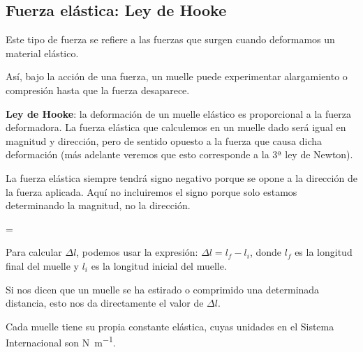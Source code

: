 \subsection{Fuerza elástica: Ley de Hooke}

Este tipo de fuerza se refiere a las fuerzas que surgen cuando deformamos un material elástico.

Así, bajo la acción de una fuerza, un muelle puede experimentar alargamiento o compresión hasta que la fuerza desaparece.

\begin{dBox}
    \textbf{Ley de Hooke}: la deformación de un muelle elástico es proporcional a la fuerza deformadora.
    La fuerza elástica que calculemos en un muelle dado será igual en magnitud y dirección, pero de sentido opuesto a la fuerza que causa dicha deformación (más adelante veremos que esto corresponde a la 3ª ley de Newton).
\end{dBox}

\begin{remark}
    La fuerza elástica siempre tendrá signo negativo porque se opone a la dirección de la fuerza aplicada.
    Aquí no incluiremos el signo porque solo estamos determinando la magnitud, no la dirección.
\end{remark}

\vspace*{20pt}
\begin{centeredequation}
    =
    \cdot
\end{centeredequation}
\vspace*{12pt}

Para calcular \( \Delta l \), podemos usar la expresión: \( \Delta l = l_f - l_i \), donde \( l_f \) es la longitud final del muelle y \( l_i \) es la longitud inicial del muelle.

\begin{remark}
    Si nos dicen que un muelle se ha estirado o comprimido una determinada distancia, esto nos da directamente el valor de \( \Delta l \).
\end{remark}

Cada muelle tiene su propia constante elástica, cuyas unidades en el Sistema Internacional son \unit{\newton\per\metre}.

